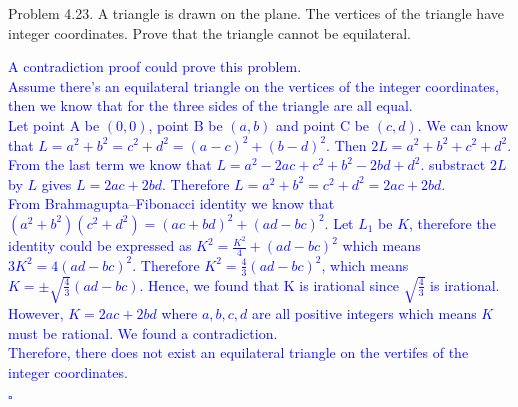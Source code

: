 \documentclass{article}
\begin{document}
\clearpage

\begin{addmargin}[2em]{2em}
Problem 4.23. A triangle is drawn on the plane. The vertices of the triangle have integer coordinates. Prove that the triangle cannot be equilateral.
	\textcolor{blue}{
	\begin{addmargin}[2em]{1em}
		A contradiction proof could prove this problem.\\
		Assume there's an equilateral triangle on the vertices of the integer coordinates, then we know that for the three sides of the triangle are all equal.\\
		Let point A be $(0,0)$, point B be $(a,b)$ and point C be $(c,d)$. We can know that $L = a^2+b^2 = c^2 + d^2 = (a-c)^2+(b-d)^2$. Then $2L = a^2 + b^2 + c^2 + d^2$. From the last term we know that $L = a^2 - 2ac +c^2 + b^2 -2bd + d^2$. substract $2L$ by $L$ gives $L = 2ac + 2bd$. Therefore $L = a^2+b^2 = c^2 + d^2 = 2ac+2bd$.\\
		From Brahmagupta–Fibonacci identity we know that $(a^2+b^2)(c^2+d^2) = (ac+bd)^2+(ad-bc)^2$. Let $L_1$ be $K$, therefore the identity could be expressed as $K^2=\frac{K^2}{4}+(ad-bc)^2$ which means $3K^2 = 4(ad-bc)^2$. 
		Therefore $K^2 = \frac{4}{3}(ad-bc)^2$, which means $K = \pm \sqrt{\frac{4}{3}}(ad-bc)$. Hence, we found that K is irational since $\sqrt{\frac{4}{3}}$ is irational. However, $K = 2ac + 2bd$ where $a,b,c,d$ are all positive integers which means $K$ must be rational. We found a contradiction.\\
		Therefore, there does not exist an equilateral triangle on the vertifes of the integer coordinates.
		\begin{flushright}
			$\square$
		\end{flushright}
	\end{addmargin}
}
\end{addmargin}
\end{document}
